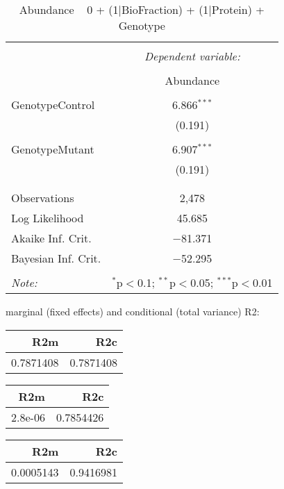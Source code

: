 \documentclass[11pt]{report}
\begin{document}
\begin{table}[!htbp] \centering 
  \caption{Abundance ~ 0 + (1|BioFraction) + (1|Protein) + Genotype} 
  \label{} 
\begin{tabular}{@{\extracolsep{5pt}}lc} 
\\[-1.8ex]\hline 
\hline \\[-1.8ex] 
 & \multicolumn{1}{c}{\textit{Dependent variable:}} \\ 
\cline{2-2} 
\\[-1.8ex] & Abundance \\ 
\hline \\[-1.8ex] 
 GenotypeControl & 6.866$^{***}$ \\ 
  & (0.191) \\ 
  & \\ 
 GenotypeMutant & 6.907$^{***}$ \\ 
  & (0.191) \\ 
  & \\ 
\hline \\[-1.8ex] 
Observations & 2,478 \\ 
Log Likelihood & 45.685 \\ 
Akaike Inf. Crit. & $-$81.371 \\ 
Bayesian Inf. Crit. & $-$52.295 \\ 
\hline 
\hline \\[-1.8ex] 
\textit{Note:}  & \multicolumn{1}{r}{$^{*}$p$<$0.1; $^{**}$p$<$0.05; $^{***}$p$<$0.01} \\ 
\end{tabular} 
\end{table} 
marginal (fixed effects) and conditional (total variance) R2:

\begin{tabular}{r|r}
\hline
R2m & R2c\\
\hline
0.7871408 & 0.7871408\\
\hline
\end{tabular}

\begin{tabular}{r|r}
\hline
R2m & R2c\\
\hline
2.8e-06 & 0.7854426\\
\hline
\end{tabular}

\begin{tabular}{r|r}
\hline
R2m & R2c\\
\hline
0.0005143 & 0.9416981\\
\hline
\end{tabular}
\end{document}
